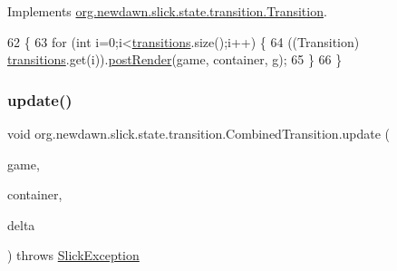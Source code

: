 Implements \mbox{\hyperlink{interfaceorg_1_1newdawn_1_1slick_1_1state_1_1transition_1_1_transition_ab8b0668c059830d938575d1a0b08bd93}{org.\+newdawn.\+slick.\+state.\+transition.\+Transition}}.


\begin{DoxyCode}
62                                                                                                           \{
63         \textcolor{keywordflow}{for} (\textcolor{keywordtype}{int} i=0;i<\mbox{\hyperlink{classorg_1_1newdawn_1_1slick_1_1state_1_1transition_1_1_combined_transition_a4fea111ea283a26351cb164e389ebbbf}{transitions}}.size();i++) \{
64             ((Transition) \mbox{\hyperlink{classorg_1_1newdawn_1_1slick_1_1state_1_1transition_1_1_combined_transition_a4fea111ea283a26351cb164e389ebbbf}{transitions}}.get(i)).\mbox{\hyperlink{classorg_1_1newdawn_1_1slick_1_1state_1_1transition_1_1_combined_transition_a31b265b22a85d140c70135142e499a81}{postRender}}(game, container, g);
65         \}
66     \}
\end{DoxyCode}
\mbox{\label{classorg_1_1newdawn_1_1slick_1_1state_1_1transition_1_1_combined_transition_a2cabd31a15e0fcddff1bcea6690fab6e}} 
\subsubsection{\texorpdfstring{update()}{update()}}
{\footnotesize\ttfamily void org.\+newdawn.\+slick.\+state.\+transition.\+Combined\+Transition.\+update (\begin{DoxyParamCaption}\item[{\mbox{\hyperlink{classorg_1_1newdawn_1_1slick_1_1state_1_1_state_based_game}{State\+Based\+Game}}}]{game,  }\item[{\mbox{\hyperlink{classorg_1_1newdawn_1_1slick_1_1_game_container}{Game\+Container}}}]{container,  }\item[{int}]{delta }\end{DoxyParamCaption}) throws \mbox{\hyperlink{classorg_1_1newdawn_1_1slick_1_1_slick_exception}{Slick\+Exception}}\hspace{0.3cm}{\ttfamily [inline]}}

